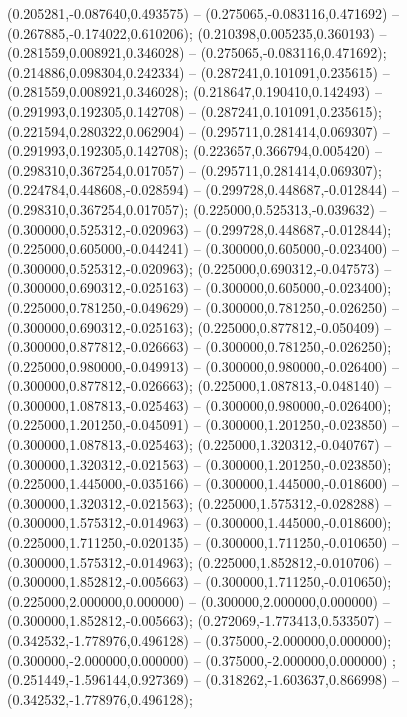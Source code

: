  (0.205281,-0.087640,0.493575) -- (0.275065,-0.083116,0.471692) -- (0.267885,-0.174022,0.610206);
 (0.210398,0.005235,0.360193) -- (0.281559,0.008921,0.346028) -- (0.275065,-0.083116,0.471692);
 (0.214886,0.098304,0.242334) -- (0.287241,0.101091,0.235615) -- (0.281559,0.008921,0.346028);
 (0.218647,0.190410,0.142493) -- (0.291993,0.192305,0.142708) -- (0.287241,0.101091,0.235615);
 (0.221594,0.280322,0.062904) -- (0.295711,0.281414,0.069307) -- (0.291993,0.192305,0.142708);
 (0.223657,0.366794,0.005420) -- (0.298310,0.367254,0.017057) -- (0.295711,0.281414,0.069307);
 (0.224784,0.448608,-0.028594) -- (0.299728,0.448687,-0.012844) -- (0.298310,0.367254,0.017057);
 (0.225000,0.525313,-0.039632) -- (0.300000,0.525312,-0.020963) -- (0.299728,0.448687,-0.012844);
 (0.225000,0.605000,-0.044241) -- (0.300000,0.605000,-0.023400) -- (0.300000,0.525312,-0.020963);
 (0.225000,0.690312,-0.047573) -- (0.300000,0.690312,-0.025163) -- (0.300000,0.605000,-0.023400);
 (0.225000,0.781250,-0.049629) -- (0.300000,0.781250,-0.026250) -- (0.300000,0.690312,-0.025163);
 (0.225000,0.877812,-0.050409) -- (0.300000,0.877812,-0.026663) -- (0.300000,0.781250,-0.026250);
 (0.225000,0.980000,-0.049913) -- (0.300000,0.980000,-0.026400) -- (0.300000,0.877812,-0.026663);
 (0.225000,1.087813,-0.048140) -- (0.300000,1.087813,-0.025463) -- (0.300000,0.980000,-0.026400);
 (0.225000,1.201250,-0.045091) -- (0.300000,1.201250,-0.023850) -- (0.300000,1.087813,-0.025463);
 (0.225000,1.320312,-0.040767) -- (0.300000,1.320312,-0.021563) -- (0.300000,1.201250,-0.023850);
 (0.225000,1.445000,-0.035166) -- (0.300000,1.445000,-0.018600) -- (0.300000,1.320312,-0.021563);
 (0.225000,1.575312,-0.028288) -- (0.300000,1.575312,-0.014963) -- (0.300000,1.445000,-0.018600);
 (0.225000,1.711250,-0.020135) -- (0.300000,1.711250,-0.010650) -- (0.300000,1.575312,-0.014963);
 (0.225000,1.852812,-0.010706) -- (0.300000,1.852812,-0.005663) -- (0.300000,1.711250,-0.010650);
 (0.225000,2.000000,0.000000) -- (0.300000,2.000000,0.000000) -- (0.300000,1.852812,-0.005663);
 (0.272069,-1.773413,0.533507) -- (0.342532,-1.778976,0.496128) -- (0.375000,-2.000000,0.000000);
 (0.300000,-2.000000,0.000000) -- (0.375000,-2.000000,0.000000) ;
 (0.251449,-1.596144,0.927369) -- (0.318262,-1.603637,0.866998) -- (0.342532,-1.778976,0.496128);
